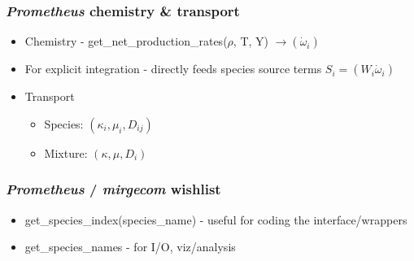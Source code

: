 \begin{frame}\frametitle{\textit{Prometheus} chemistry \& transport}
\begin{itemize}
\item Chemistry - get\_net\_production\_rates($\rho$, T, Y) $\rightarrow (\dot{\omega}_i)$
\item For explicit integration - directly feeds species source terms $S_i = (W_i \dot{\omega}_i)$
\item Transport
   \begin{itemize}
      \item Species:  $(\kappa_i, \mu_i, D_{ij})$
      \item Mixture: $(\kappa, \mu, D_i)$
   \end{itemize}
\end{itemize}
\end{frame}

\begin{frame}\frametitle{\textit{Prometheus} / \textit{mirgecom} wishlist}
\begin{itemize}
   \item get\_species\_index(species\_name) - useful for coding the interface/wrappers
   \item get\_species\_names - for I/O, viz/analysis
\end{itemize}           
\end{frame}






